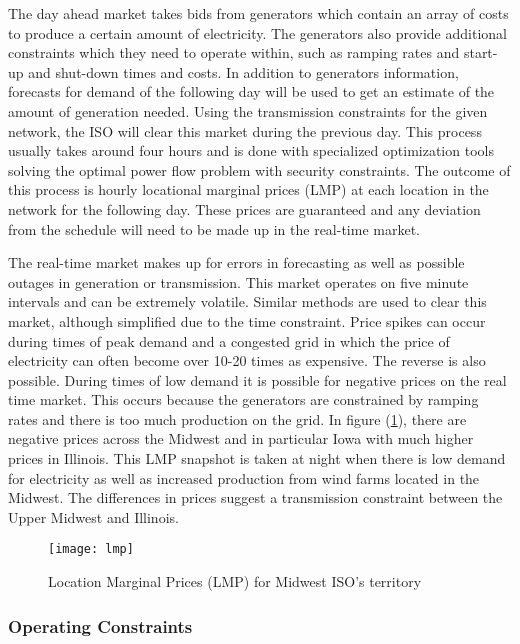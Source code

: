 The day ahead market takes bids from generators which contain an array of costs to produce a certain amount of electricity.  The generators also provide additional constraints which they need to operate within, such as ramping rates and start-up and shut-down times and costs.  In addition to generators information, forecasts for demand of the following day will be used to get an estimate of the amount of generation needed.  Using the transmission constraints for the given network, the ISO will clear this market during the previous day.  This process usually takes around four hours and is done with specialized optimization tools solving the optimal power flow problem with security constraints.  The outcome of this process is hourly locational marginal prices (LMP) at each location in the network for the following day.  These prices are guaranteed and any deviation from the schedule will need to be made up in the real-time market.	

The real-time market makes up for errors in forecasting as well as possible outages in generation or transmission.  This market operates on five minute intervals and can be extremely volatile.  Similar methods are used to clear this market, although simplified due to the time constraint.  Price spikes can occur during times of peak demand and a congested grid in which the price of electricity can often become over 10-20 times as expensive.  The reverse is also possible.  During times of low demand it is possible for negative prices on the real time market.  This occurs because the generators are constrained by ramping rates and there is too much production on the grid. In figure (\ref{fig:lmpmiso}), there are negative prices across the Midwest and in particular Iowa with much higher prices in Illinois.  This LMP snapshot is taken at night when there is low demand for electricity as well as increased production from wind farms located in the Midwest.  The differences in prices suggest a transmission constraint between the Upper Midwest and Illinois.   


\begin{figure}
\centering
\texttt{[image: lmp]}  
\caption{Location Marginal Prices (LMP) for Midwest ISO's territory}
\label{fig:lmpmiso}
\end{figure}


\subsubsection{Operating Constraints}

